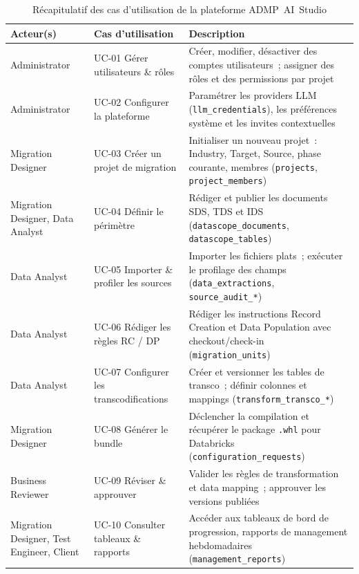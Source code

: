 \begin{table}[H]
\centering
\caption{Récapitulatif des cas d'utilisation de la plateforme ADMP~AI~Studio}
\label{tab:uc-recap}
\begin{tabularx}{\textwidth}{llX}
\toprule
\textbf{Acteur(s)} & \textbf{Cas d'utilisation} & \textbf{Description} \\
\midrule
Administrator &
  UC-01 Gérer utilisateurs \& rôles &
  Créer, modifier, désactiver des comptes utilisateurs~; assigner des rôles et des permissions par projet \\
\addlinespace
Administrator &
  UC-02 Configurer la plateforme &
  Paramétrer les providers LLM (\texttt{llm\_credentials}), les préférences système et les invites contextuelles \\
\addlinespace
Migration Designer &
  UC-03 Créer un projet de migration &
  Initialiser un nouveau projet~: Industry, Target, Source, phase courante, membres (\texttt{projects}, \texttt{project\_members}) \\
\addlinespace
Migration Designer, Data Analyst &
  UC-04 Définir le périmètre &
  Rédiger et publier les documents SDS, TDS et IDS (\texttt{datascope\_documents}, \texttt{datascope\_tables}) \\
\addlinespace
Data Analyst &
  UC-05 Importer \& profiler les sources &
  Importer les fichiers plats~; exécuter le profilage des champs (\texttt{data\_extractions}, \texttt{source\_audit\_*}) \\
\addlinespace
Data Analyst &
  UC-06 Rédiger les règles RC / DP &
  Rédiger les instructions Record Creation et Data Population avec checkout/check-in (\texttt{migration\_units}) \\
\addlinespace
Data Analyst &
  UC-07 Configurer les transcodifications &
  Créer et versionner les tables de transco~; définir colonnes et mappings (\texttt{transform\_transco\_*}) \\
\addlinespace
Migration Designer &
  UC-08 Générer le bundle &
  Déclencher la compilation et récupérer le package \texttt{.whl} pour Databricks (\texttt{configuration\_requests}) \\
\addlinespace
Business Reviewer &
  UC-09 Réviser \& approuver &
  Valider les règles de transformation et data mapping~; approuver les versions publiées \\
\addlinespace
Migration Designer, Test Engineer, Client &
  UC-10 Consulter tableaux \& rapports &
  Accéder aux tableaux de bord de progression, rapports de management hebdomadaires (\texttt{management\_reports}) \\

\end{tabularx}
\end{table}
